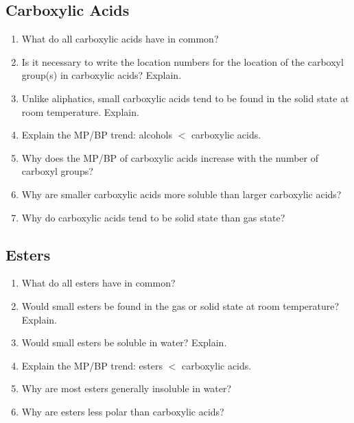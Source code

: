 \documentclass[12pt]{article}
\begin{document}
\begin{center}
    \subsection*{Carboxylic Acids}
\end{center}

\begin{enumerate}[label=\arabic*.]
    \item What do all carboxylic acids have in common?
    \vspace{1.5cm}
    \item Is it necessary to write the location numbers for the location of the carboxyl group(s) in carboxylic acids? Explain.
    \vspace{1.5cm}
    \item Unlike aliphatics, small carboxylic acids tend to be found in the solid state at room temperature. Explain.
    \vspace{1.5cm}
    \item Explain the MP/BP trend: alcohols $<$ carboxylic acids.
    \vspace{1.5cm}
    \item Why does the MP/BP of carboxylic acids increase with the number of carboxyl groups?
    \vspace{1.5cm}
    \item Why are smaller carboxylic acids more soluble than larger carboxylic acids?
    \vspace{1.5cm}
    \item Why do carboxylic acids tend to be solid state than gas state?
    \vspace{1.5cm}
\end{enumerate}

\newpage

\begin{center}
    \subsection*{Esters}
\end{center}

\begin{enumerate}[label=\arabic*.]
    \item What do all esters have in common?
    \vspace{1.5cm}
    \item Would small esters be found in the gas or solid state at room temperature? Explain.
    \vspace{1.5cm}
    \item Would small esters be soluble in water? Explain.
    \vspace{1.5cm}
    \item Explain the MP/BP trend: esters $<$ carboxylic acids.
    \vspace{1.5cm}
    \item Why are most esters generally insoluble in water?
    \vspace{1.5cm}
    \item Why are esters less polar than carboxylic acids?
    \vspace{1.5cm}
\end{enumerate}
\end{document}
